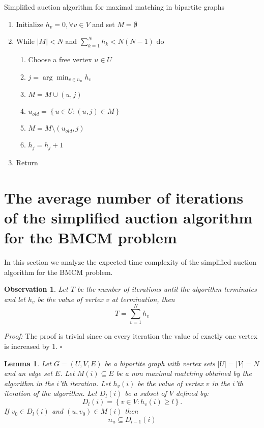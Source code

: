 \documentclass[11pt,onecolumn]{article}
\newcounter{theorem}
\newtheorem{lemma}[theorem]{Lemma}
\newcommand{\beq}{\begin{equation}}
\newcommand{\eeq}{\end{equation}}
\newenvironment{proof}{\textit{Proof:}}{\hfill$\square$\\}
\newtheorem{observation}{Observation}
\begin{document}
\begin{table}
\label{table_alg}
\caption{Simplified auction algorithm for maximal matching in bipartite graphs}
\begin{enumerate}
\item Initialize $h_v=0,\forall v\in V$ and set $M=\emptyset$
\item While $|M|<N$ and $\sum_{k=1}^Nh_k<N(N-1)$ do
\begin{enumerate}
\item Choose a free vertex $u\in U$
\item $j=\arg\min_{v\in n_{u}}h_v$
\item $M= M\cup (u,j)$
\item $u_{old}=\left\{u \in U:(u,j)\in M\right\}$
\item $M=M\setminus(u_{old},j)$
\item $h_j=h_j+1$
\end{enumerate}
\item Return
\end{enumerate}

\end{table}


\section{The average number of iterations of the simplified auction algorithm for the BMCM problem}
\label{section_alg}
In this section we analyze the expected time complexity of the simplified auction algorithm for the BMCM problem.
\begin{observation} \label{lamma_T_sum_H}Let $T$ be the number of iterations until the algorithm terminates and let $h_v$ be the value of vertex $v$ at termination, then
\beq
T=\sum_{v=1}^N h_v
\eeq
\end{observation}

\begin{proof}
The proof is trivial since on every iteration the value of exactly one vertex is increased by $1$.
\end{proof}
\begin{lemma}
\label{lemma_neighbor}Let $G=(U,V,E)$ be a bipartite graph with vertex sets $|U|=|V|=N$ and an edge set $E$. Let $M(i)\subseteq E$ be a non maximal matching obtained by the algorithm in the $i$'th iteration. Let $h_v(i)$ be the value of vertex $v$ in the $i$'th iteration of the algorithm.
Let $D_l(i)$ be a subset of $V$ defined by:
\beq
D_l(i)=\left\{v\in V:h_v(i)\geq l\right\}.
\eeq
If $v_0\in D_l(i)$ and $(u,v_0)\in M(i)$ then
\beq
n_u\subseteq D_{l-1}(i)
\eeq
\end{lemma}
\end{document}
